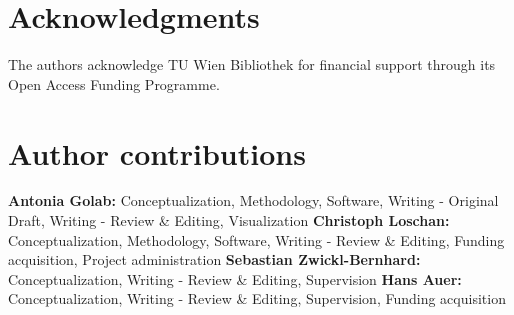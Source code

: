 \documentclass[final,10pt]{elsarticle}
\begin{document}
 
        
\section*{Acknowledgments}
The authors acknowledge TU Wien Bibliothek for financial support through its Open Access Funding Programme.
\section*{Author contributions}
\textbf{Antonia Golab:} Conceptualization, Methodology, Software, Writing - Original Draft, Writing - Review \& Editing, Visualization \textbf{Christoph Loschan:} Conceptualization, Methodology, Software, Writing - Review \& Editing, Funding acquisition, Project administration \textbf{Sebastian Zwickl-Bernhard:} Conceptualization, Writing - Review \& Editing, Supervision \textbf{Hans Auer:} Conceptualization, Writing - Review \& Editing, Supervision, Funding acquisition



\newpage
\appendix
\end{document}
